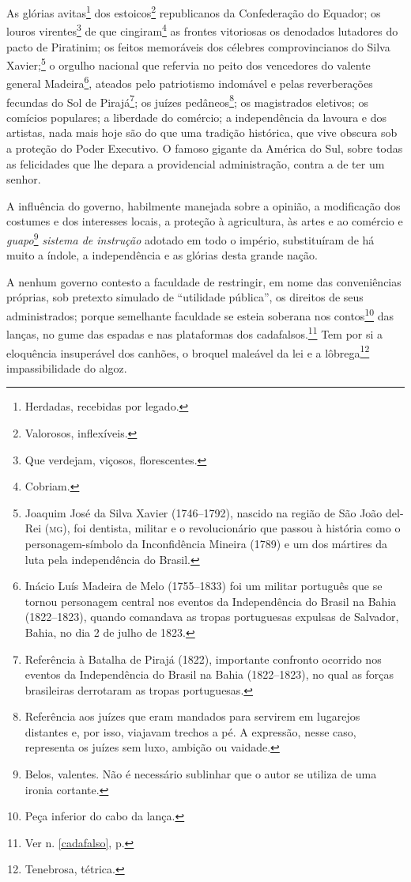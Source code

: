 As glórias avitas\footnote{Herdadas, recebidas por legado.} dos
estoicos\footnote{Valorosos, inflexíveis.} republicanos da
Confederação do Equador; os louros virentes\footnote{Que verdejam,
  viçosos, florescentes.} de que cingiram\footnote{Cobriam.} as
frontes vitoriosas os denodados lutadores do pacto de Piratinim; os
feitos memoráveis dos célebres comprovincianos do Silva
Xavier;\footnote{Joaquim José da Silva Xavier (1746--1792), nascido na
  região de São João del-Rei (\textsc{mg}), foi dentista, militar e o
  revolucionário que passou à história como o personagem-símbolo da
  Inconfidência Mineira (1789) e um dos mártires da luta pela
  independência do Brasil.} o orgulho nacional que refervia no peito
dos vencedores do valente general Madeira\footnote{Inácio Luís Madeira
  de Melo (1755--1833) foi um militar português que se tornou personagem
  central nos eventos da Independência do Brasil na Bahia (1822--1823),
  quando comandava as tropas portuguesas expulsas de Salvador, Bahia, no
  dia 2 de julho de 1823.}, ateados pelo patriotismo indomável e pelas
reverberações fecundas do Sol de Pirajá\footnote{Referência à Batalha de Pirajá 
(1822), importante confronto ocorrido nos eventos da
  Independência do Brasil na Bahia (1822--1823), no qual as forças
  brasileiras derrotaram as tropas portuguesas.}; os juízes
pedâneos\footnote{Referência aos juízes que eram mandados para
  servirem em lugarejos distantes e, por isso, viajavam trechos a pé. A
  expressão, nesse caso, representa os juízes sem luxo, ambição ou
  vaidade.}; os magistrados eletivos; os comícios populares; a liberdade
do comércio; a independência da lavoura e dos artistas, nada mais hoje
são do que uma tradição histórica, que vive obscura sob a proteção do
Poder Executivo. O famoso gigante da América do Sul, sobre todas as
felicidades que lhe depara a providencial administração, contra a de ter
um senhor.

A influência do governo, habilmente manejada sobre a opinião, a
modificação dos costumes e dos interesses locais, a proteção à
agricultura, às artes e ao comércio e \emph{guapo}\footnote{Belos,
  valentes. Não é necessário sublinhar que o autor se utiliza de uma
  ironia cortante.} \emph{sistema de instrução} adotado em todo o
império, substituíram de há muito a índole, a independência e as glórias
desta grande nação.

A nenhum governo contesto a faculdade de restringir, em nome das
conveniências próprias, sob pretexto simulado de ``utilidade pública'', os
direitos de seus administrados; porque semelhante faculdade se esteia
soberana nos contos\footnote{Peça inferior do cabo da lança.} das
lanças, no gume das espadas e nas plataformas dos cadafalsos.\footnote{Ver n. \ref{cadafalso}, 
p. \pageref{cadafalso}} Tem por si a eloquência insuperável dos canhões, 
o broquel maleável da lei e a lôbrega\footnote{Tenebrosa, tétrica.} impassibilidade do
algoz.

